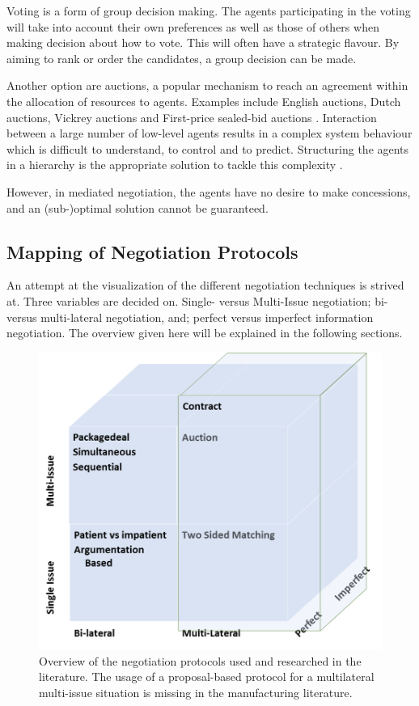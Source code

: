 Voting is a form of group decision making. The agents participating in the voting will take into account their own preferences as well as those of others when making decision about how to vote. This will often have a strategic flavour. By aiming to rank or order the candidates, a group decision can be made.

Another option are auctions, a popular mechanism to reach an agreement within the allocation of resources to agents. Examples include English auctions, Dutch auctions, Vickrey auctions and First-price sealed-bid auctions \citep{wooldridge2009introduction}. Interaction between a large number of low-level agents results in a complex system behaviour which is difficult to understand, to control and to predict. Structuring the agents in a hierarchy is the appropriate solution to tackle this complexity \citep{van1998reference}.

However, in mediated negotiation, the agents have no desire to make concessions, and an (sub-)optimal solution cannot be guaranteed.

\subsection{Mapping of Negotiation Protocols}
An attempt at the visualization of the different negotiation techniques is strived at. Three variables are decided on. Single- versus Multi-Issue negotiation; bi- versus multi-lateral negotiation, and; perfect versus imperfect information negotiation. The overview given here will be explained in the following sections.
\begin{figure}[h]
	\centering
	\includegraphics[width=0.7\linewidth]{img/mapping_nego}
	\caption{Overview of the negotiation protocols used and researched in the literature. The usage of a proposal-based protocol for a multilateral multi-issue situation is missing in the manufacturing literature.}
	\label{fig:mapping_nego}
\end{figure}


